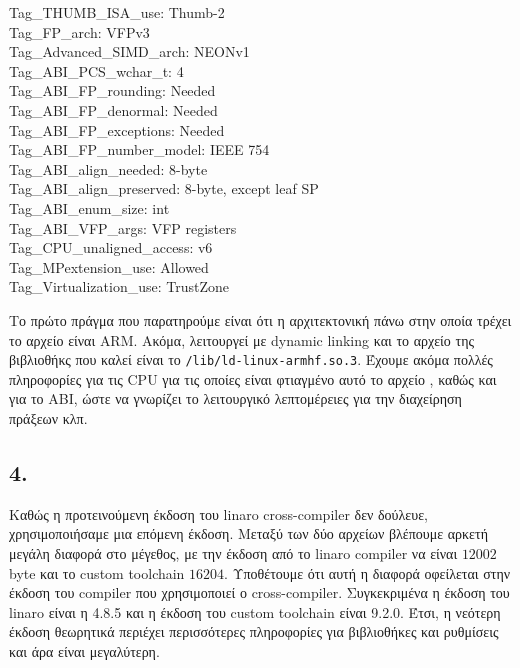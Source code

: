 \documentclass{article}
\newcommand{\english}[1]{\foreignlanguage{english}{{#1}}}
\begin{document}
\begin{otherlanguage}{english}
\begin{tcolorbox}[width=\linewidth, colback={backcolour}, colupper=black]
        Tag\_THUMB\_ISA\_use: Thumb-2 \\
        Tag\_FP\_arch: VFPv3 \\
        Tag\_Advanced\_SIMD\_arch: NEONv1 \\
        Tag\_ABI\_PCS\_wchar\_t: 4 \\
        Tag\_ABI\_FP\_rounding: Needed \\
        Tag\_ABI\_FP\_denormal: Needed \\
        Tag\_ABI\_FP\_exceptions: Needed \\
        Tag\_ABI\_FP\_number\_model: IEEE 754 \\
        Tag\_ABI\_align\_needed: 8-byte \\
        Tag\_ABI\_align\_preserved: 8-byte, except leaf SP \\
        Tag\_ABI\_enum\_size: int \\
        Tag\_ABI\_VFP\_args: VFP registers \\
        Tag\_CPU\_unaligned\_access: v6 \\
        Tag\_MPextension\_use: Allowed \\
        Tag\_Virtualization\_use: TrustZone
    \end{tcolorbox}
\end{otherlanguage}

Το πρώτο πράγμα που παρατηρούμε είναι ότι η αρχιτεκτονική πάνω στην οποία τρέχει το αρχείο είναι \english{ARM}. Ακόμα, λειτουργεί με \english{dynamic linking} και το αρχείο της βιβλιοθήκς που καλεί είναι το \english{\texttt{/lib/ld-linux-armhf.so.3}}. Έχουμε ακόμα πολλές πληροφορίες για τις \english{CPU} για τις οποίες είναι φτιαγμένο αυτό το αρχείο , καθώς και για το \english{ABI}, ώστε να γνωρίζει το λειτουργικό λεπτομέρειες για την διαχείρηση πράξεων κλπ.

\subsection*{4.}
Καθώς η προτεινούμενη έκδοση του \english{linaro cross-compiler} δεν δούλευε, χρησιμοποιήσαμε μια επόμενη έκδοση. Μεταξύ των δύο αρχείων βλέπουμε αρκετή μεγάλη διαφορά στο μέγεθος, με την έκδοση από το \english{linaro compiler} να είναι $12002$ \english{byte} και το \english{custom toolchain} $16204$. Υποθέτουμε ότι αυτή η διαφορά οφείλεται στην έκδοση του \english{compiler} που χρησιμοποιεί ο \english{cross-compiler}. Συγκεκριμένα η έκδοση του \english{linaro} είναι η 4.8.5 και η έκδοση του \english{custom toolchain} είναι 9.2.0. Έτσι, η νεότερη έκδοση θεωρητικά περιέχει περισσότερες πληροφορίες για βιβλιοθήκες και ρυθμίσεις και άρα είναι μεγαλύτερη.
\end{document}

